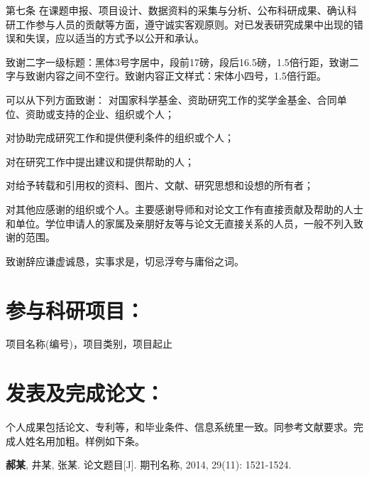 \documentclass{cqupt_thesis}
\begin{document}
    第七条 在课题申报、项目设计、数据资料的采集与分析、公布科研成果、确认科研工作参与人员的贡献等方面，遵守诚实客观原则。对已发表研究成果中出现的错误和失误，应以适当的方式予以公开和承认。

    \begin{acknowledgements}
        致谢二字一级标题：黑体3号字居中，段前17磅，段后16.5磅，1.5倍行距，致谢二字与致谢内容之间不空行。致谢内容正文样式：宋体小四号，1.5倍行距。

        可以从下列方面致谢：
        对国家科学基金、资助研究工作的奖学金基金、合同单位、资助或支持的企业、组织或个人；

        对协助完成研究工作和提供便利条件的组织或个人；

        对在研究工作中提出建议和提供帮助的人；

        对给予转载和引用权的资料、图片、文献、研究思想和设想的所有者；

        对其他应感谢的组织或个人。主要感谢导师和对论文工作有直接贡献及帮助的人士和单位。学位申请人的家属及亲朋好友等与论文无直接关系的人员，一般不列入致谢的范围。

        致谢辞应谦虚诚恳，实事求是，切忌浮夸与庸俗之词。

    \end{acknowledgements}

    \begin{mastermainwork}
        \section*{参与科研项目：}
        \begin{achievements}
            \item 项目名称(编号)，项目类别，项目起止
        \end{achievements}

        \section*{发表及完成论文：}
        \begin{achievements}
            \item 个人成果包括论文、专利等，和毕业条件、信息系统里一致。同参考文献要求。完成人姓名用加粗。样例如下条。
            \item \textbf{郝某}, 井某, 张某. 论文题目[J]. 期刊名称, 2014, 29(11): 1521-1524.
        \end{achievements}
    \end{mastermainwork}
\end{document}
